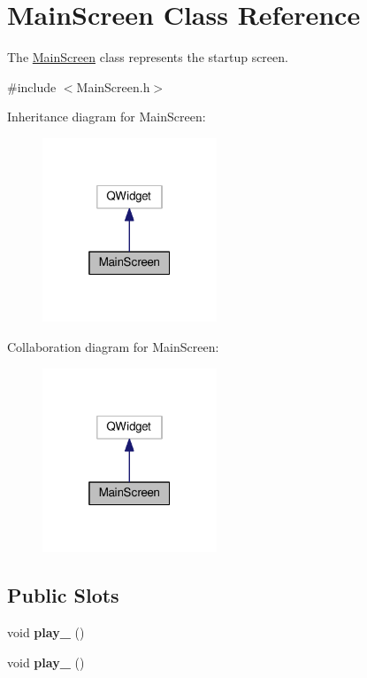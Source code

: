 \hypertarget{class_main_screen}{}\section{Main\+Screen Class Reference}
\label{class_main_screen}


The \hyperlink{class_main_screen}{Main\+Screen} class represents the startup screen.  




{\ttfamily \#include $<$Main\+Screen.\+h$>$}



Inheritance diagram for Main\+Screen\+:\nopagebreak
\begin{figure}[H]
\begin{center}
\leavevmode
\includegraphics[width=148pt]{class_main_screen__inherit__graph}
\end{center}
\end{figure}


Collaboration diagram for Main\+Screen\+:\nopagebreak
\begin{figure}[H]
\begin{center}
\leavevmode
\includegraphics[width=148pt]{class_main_screen__coll__graph}
\end{center}
\end{figure}
\subsection*{Public Slots}
\begin{DoxyCompactItemize}
\item 
void {\bfseries play\+\_} ()\hypertarget{class_main_screen_a8803ff60a438d7fdc64a58dcbd10ee84}{}\label{class_main_screen_a8803ff60a438d7fdc64a58dcbd10ee84}

\item 
void {\bfseries play\+\_} ()\hypertarget{class_main_screen_afcd44fd9e2f02c928b97a2d3c61bb8b0}{}\label{class_main_screen_afcd44fd9e2f02c928b97a2d3c61bb8b0}

\end{DoxyCompactItemize}
